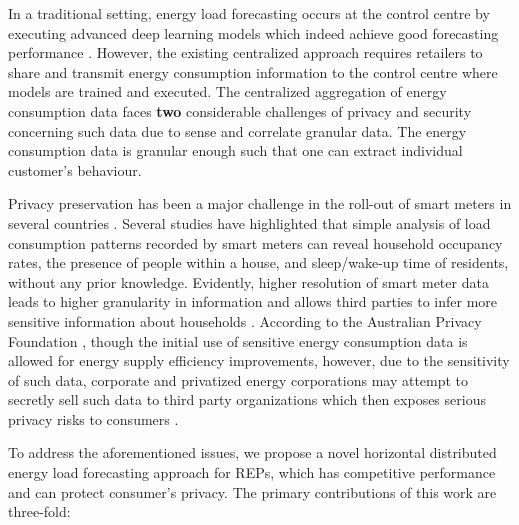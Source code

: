 \documentclass[10pt, conference]{IEEEtran}
\begin{document}
In a traditional setting, energy load forecasting occurs at the control centre by executing advanced deep learning models which indeed achieve good forecasting performance \cite{ Gholizadeh_Musilek_2022}. However, the existing centralized approach requires retailers to share and transmit energy consumption information to the control centre where models are trained and executed. The centralized aggregation of energy consumption data faces \textbf{two} considerable challenges of privacy and security \cite{9594795, husnoo2021false} concerning such data due to sense and correlate granular data. The energy consumption data is granular enough such that one can extract individual customer’s behaviour.

Privacy preservation has been a major challenge in the roll-out of smart meters in several countries \cite{6555824}. Several studies \cite{10.1145/1878431.1878446, 10.1145/2528282.2528295} have highlighted that simple analysis of load consumption patterns recorded by smart meters can reveal household occupancy rates, the presence of people within a house, and sleep/wake-up time of residents, without any prior knowledge. Evidently, higher resolution of smart meter data leads to higher granularity in information and allows third parties to infer more sensitive information about households \cite{Farokhi_2020}. According to the Australian Privacy Foundation \cite{AustralianPrivacyFoundation}, though the initial use of sensitive energy consumption data is allowed for energy supply efficiency improvements, however, due to the sensitivity of such data, corporate and privatized energy corporations may attempt to secretly sell such data to third party organizations which then exposes serious privacy risks to consumers \cite{AustralianPrivacyFoundation}. 

To address the aforementioned issues, we propose a novel horizontal distributed energy load forecasting approach for REPs, which has competitive performance and can protect consumer's privacy. The primary contributions of this work are three-fold:
\end{document}
